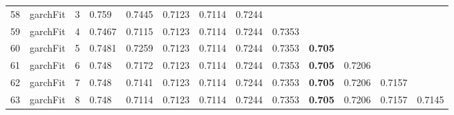 \documentclass[10pt,a4paper]{article}
\begin{document}
\begin{table}[ht]
\begin{tabular}{rlrllllllllll}
  58 & garchFit &     3 & 0.759 & 0.7445 & 0.7123 & 0.7114 & 0.7244 &  &  &  &  &  \\ 
  59 & garchFit &     4 & 0.7467 & 0.7115 & 0.7123 & 0.7114 & 0.7244 & 0.7353 &  &  &  &  \\ 
  60 & garchFit &     5 & 0.7481 & 0.7259 & 0.7123 & 0.7114 & 0.7244 & 0.7353 & \textbf{0.705} &  &  &  \\ 
  61 & garchFit &     6 & 0.748 & 0.7172 & 0.7123 & 0.7114 & 0.7244 & 0.7353 & \textbf{0.705} & 0.7206 &  &  \\ 
  62 & garchFit &     7 & 0.748 & 0.7141 & 0.7123 & 0.7114 & 0.7244 & 0.7353 & \textbf{0.705} & 0.7206 & 0.7157 &  \\ 
  63 & garchFit &     8 & 0.748 & 0.7114 & 0.7123 & 0.7114 & 0.7244 & 0.7353 & \textbf{0.705} & 0.7206 & 0.7157 & 0.7145 \\ 
   \hline
\end{tabular}
\end{table}
\end{document}
